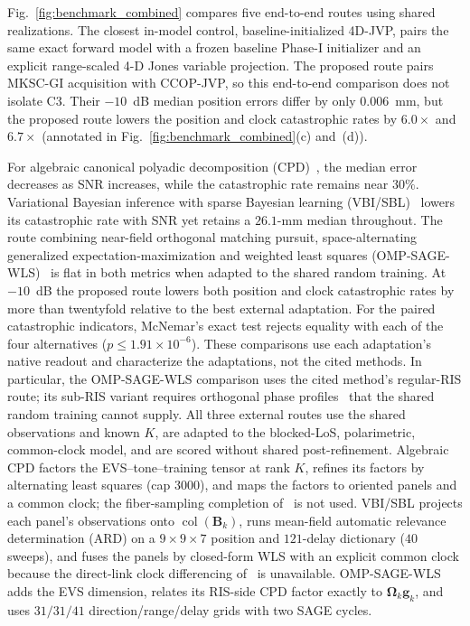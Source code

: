 \documentclass[letterpaper,journal]{IEEEtran}
\newcommand{\bg}{\mathbf{g}}
\newcommand{\bBm}{\mathbf{B}}
\newcommand{\bOmega}{\boldsymbol{\Omega}}
\newcommand{\coll}{\operatorname{col}}
\begin{document}
Fig.~\ref{fig:benchmark_combined} compares five end-to-end routes using shared
realizations. The closest in-model control, baseline-initialized 4D-JVP,
pairs the same exact forward model with a frozen baseline Phase-I initializer
and an explicit range-scaled 4-D Jones variable projection. The proposed
route pairs MKSC-GI acquisition with CCOP-JVP, so this end-to-end comparison
does not isolate C3. Their $-10$~dB median position errors differ by only
$0.006$~mm, but the proposed route lowers
the position and clock catastrophic rates by $6.0\times$ and $6.7\times$
(annotated in Fig.~\ref{fig:benchmark_combined}(c) and~(d)).

For algebraic canonical polyadic decomposition (CPD)~\cite{lin2021tensor}, the median error
decreases as SNR increases, while the catastrophic rate remains near $30\%$. Variational Bayesian inference with sparse
Bayesian learning (VBI/SBL)~\cite{li2024vbi} lowers its catastrophic rate with
SNR yet retains a $26.1$-mm median throughout. The route combining near-field orthogonal matching pursuit,
space-alternating generalized expectation-maximization and weighted least
squares (OMP-SAGE-WLS)~\cite{yan2025ris} is flat in both metrics when adapted
to the shared random training. At $-10$~dB the proposed
route lowers both position and clock catastrophic rates by more than
twentyfold relative to the best external adaptation. For the paired
catastrophic indicators, McNemar's exact test rejects equality with each of
the four alternatives ($p\le1.91\times10^{-6}$). These comparisons use each adaptation's
native readout and characterize the adaptations, not the cited methods. In
particular, the OMP-SAGE-WLS comparison uses the cited method's regular-RIS
route; its sub-RIS variant requires orthogonal phase
profiles~\cite{yan2025ris} that the shared random training cannot supply.
All three external routes use the shared observations and known $K$, are
adapted to the blocked-LoS, polarimetric, common-clock model, and are scored
without shared post-refinement. Algebraic CPD factors the
EVS--tone--training tensor at rank $K$, refines its factors by alternating
least squares (cap $3000$), and maps the factors to oriented panels and a common clock; the
fiber-sampling completion of~\cite{lin2021tensor} is not used. VBI/SBL
projects each panel's observations onto $\coll(\bBm_k)$, runs mean-field
automatic relevance determination (ARD) on a $9\times9\times7$ position and $121$-delay
dictionary ($40$ sweeps), and fuses the panels by closed-form WLS with an
explicit common clock because the direct-link clock differencing
of~\cite{li2024vbi} is unavailable. OMP-SAGE-WLS adds the EVS dimension,
relates its RIS-side CPD factor exactly to $\bOmega_k\bg_k$, and uses
$31/31/41$ direction/range/delay grids with two SAGE cycles.
\end{document}
